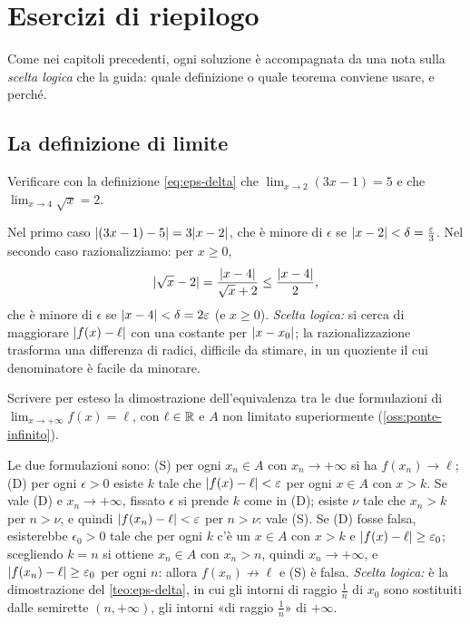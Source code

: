 \section{Esercizi di riepilogo}
\label{sec:esercizi-cap4}

Come nei capitoli precedenti, ogni soluzione è accompagnata da una nota sulla
\emph{scelta logica} che la guida: quale definizione o quale teorema conviene usare, e
perché.

\subsection*{La definizione di limite}

\begin{esercizio}\label{es:eps-delta-radice}
Verificare con la definizione \eqref{eq:eps-delta} che $\lim_{x\to2}(3x-1)=5$ e che
$\lim_{x\to4}\sqrt x=2$.
\begin{soluzione}
Nel primo caso $\lvert (3x-1)-5\rvert=3\lvert x-2\rvert$, che è minore di $\epsilon$ se
$\lvert x-2\rvert<\delta=\frac{\varepsilon}3$. Nel secondo caso razionalizziamo: per $x\ge0$,
\[
  \lvert \sqrt x-2\rvert=\frac{\lvert x-4\rvert}{\sqrt x+2}\le\frac{\lvert x-4\rvert}2,
\]
che è minore di $\epsilon$ se $\lvert x-4\rvert<\delta=2\varepsilon$ (e $x\ge0$).
\emph{Scelta logica:} si cerca di maggiorare $\lvert f(x)-\ell\rvert$ con una costante per $\lvert x-x_{0}\rvert$;
la razionalizzazione trasforma una differenza di radici, difficile da stimare, in un
quoziente il cui denominatore è facile da minorare.
\end{soluzione}
\end{esercizio}

\begin{esercizio}\label{es:ponte-infinito}
Scrivere per esteso la dimostrazione dell'equivalenza tra le due formulazioni di
$\lim_{x\to+\infty}f(x)=\ell$, con $\ell\in\mathbb{R}$ e $A$ non limitato superiormente
(\cref{oss:ponte-infinito}).
\begin{soluzione}
Le due formulazioni sono: (S) per ogni $x_{n}\in A$ con $x_{n}\to+\infty$ si ha
$f(x_{n})\to\ell$; (D) per ogni $\epsilon>0$ esiste $k$ tale che $\lvert f(x)-\ell\rvert<\varepsilon$
per ogni $x\in A$ con $x>k$. Se vale (D) e $x_{n}\to+\infty$, fissato $\epsilon$ si
prende $k$ come in (D); esiste $\nu$ tale che $x_{n}>k$ per $n>\nu$, e quindi
$\lvert f(x_{n})-\ell\rvert<\varepsilon$ per $n>\nu$: vale (S). Se (D) fosse falsa, esisterebbe
$\epsilon_{0}>0$ tale che per ogni $k$ c'è un $x\in A$ con $x>k$ e
$\lvert f(x)-\ell\rvert\ge\varepsilon_{0}$; scegliendo $k=n$ si ottiene $x_{n}\in A$ con $x_{n}>n$,
quindi $x_{n}\to+\infty$, e $\lvert f(x_{n})-\ell\rvert\ge\varepsilon_{0}$ per ogni $n$: allora
$f(x_{n})\not\to\ell$ e (S) è falsa. \emph{Scelta logica:} è la dimostrazione del
\cref{teo:eps-delta}, in cui gli intorni di raggio $\frac1n$ di $x_{0}$ sono sostituiti
dalle semirette $(n,+\infty)$, gli intorni «di raggio $\frac1n$» di $+\infty$.
\end{soluzione}
\end{esercizio}

